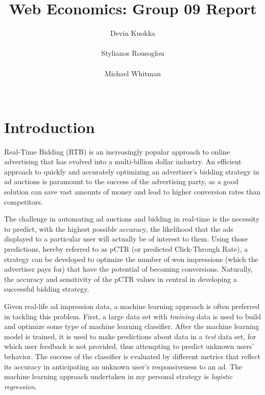 \documentclass{sig-alternate-05-2015}
\begin{document}

\title{Web Economics: Group 09 Report}

\author{
\alignauthor
Devin Kuokka\\
       \\
\alignauthor
Stylianos Rousoglou\\
       \\
\alignauthor
Michael Whitman\\
       \\
}
\maketitle

\section{Introduction}
Real-Time Bidding (RTB) is an increasingly popular approach to online advertising that has evolved into a multi-billion dollar industry. An efficient approach to quickly and accurately optimizing an advertiser's bidding strategy in ad auctions is paramount to the success of the advertising party, as a good solution can save vast amounts of money and lead to higher conversion rates than competitors.

The challenge in automating ad auctions and bidding in real-time is the necessity to predict, with the highest possible accuracy, the likelihood that the ads displayed to a particular user will actually be of interest to them. Using those predictions, hereby referred to as pCTR (or predicted Click-Through Rate), a strategy can be developed to optimize the number of won impressions (which the advertiser pays for) that have the potential of becoming conversions. Naturally, the accuracy and sensitivity of the pCTR values in central in developing a successful bidding strategy.

Given real-life ad impression data, a machine learning approach is often preferred in tackling this problem. First, a large data set with \textit{training} data is used to build and optimize some type of machine learning classifier. After the machine learning model is trained, it is used to make predictions about data in a \textit{test} data set, for which user feedback is not provided, thus attempting to predict unknown users' behavior. The success of the classifier is evaluated by different metrics that reflect its accuracy in anticipating an unknown user's responsiveness to an ad. The machine learning approach undertaken in my personal strategy is \textit{logistic regression}.
\end{document}
